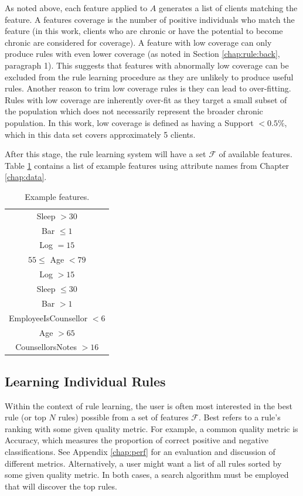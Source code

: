 As noted above, each feature applied to $A$ generates a list of clients matching the feature. A features coverage is the number of positive individuals who match the feature (in this work, clients who are chronic or have the potential to become chronic are considered for coverage). A feature with low coverage can only produce rules with even lower coverage (as noted in Section \ref{chap:rule:back}, paragraph 1). This suggests that features with abnormally low coverage can be excluded from the rule learning procedure as they are unlikely to produce useful rules.
Another reason to trim low coverage rules is they can lead to over-fitting. Rules with low coverage are inherently over-fit as they target a small subset of the population which does not necessarily represent the broader chronic population.
In this work, low coverage is defined as having a Support $< 0.5\%$, which in this data set covers approximately 5 clients.

After this stage, the rule learning system will have a set $\mathcal{F}$ of available features. Table \ref{tbl:rule:examplefeatures} contains a list of example features using attribute names from Chapter \ref{chap:data}.


\begin{table}[h]
	\centering

	\begin{tabular}{c}
	\toprule
	Sleep $> 30$ \\
	Bar $\leq 1$ \\
	Log $= 15$ \\
	$55 \leq$ Age $< 79$ \\
	Log $> 15$  \\
	Sleep $\leq 30$ \\
	Bar $> 1$ \\
	EmployeeIsCounsellor $< 6$ \\
	Age $> 65$ \\
	CounsellorsNotes $> 16$ \\

	\bottomrule
	\end{tabular}

	\caption{Example features.}
	\label{tbl:rule:examplefeatures}
\end{table}


\subsection{Learning Individual Rules} \label{chap:rule:individual}
Within the context of rule learning, the user is often most interested in the best rule (or top $N$ rules) possible from a set of features $\mathcal{F}$. Best refers to a rule's ranking with some given quality metric. For example, a common quality metric is Accuracy, which measures the proportion of correct positive and negative classifications. See Appendix \ref{chap:perf} for an evaluation and discussion of different metrics.  Alternatively, a user might want a list of all rules sorted by some given quality metric. In both cases, a search algorithm must be employed that will discover the top rules.


